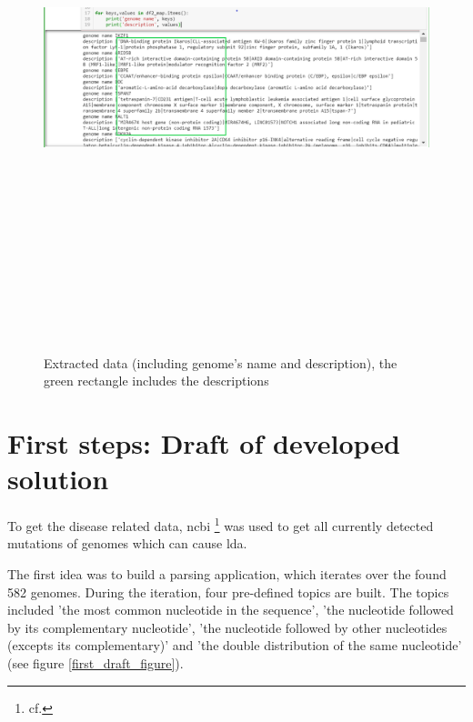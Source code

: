 \begin{figure}[htbp]
	\centering
	\includegraphics[width=1\textwidth, height=600px, keepaspectratio]{Image/gene_description.png}
	\caption{Extracted data (including genome's name and description), the green rectangle includes the descriptions}
	\label{gene_description_figure}
\end{figure}

\section{First steps: Draft of developed solution}\label{draft}

To get the disease related data, \gls{ncbi} \footnote{cf.\autocite{ncbi}} was used to get all currently detected mutations of genomes which can cause \gls{lda}.

The first idea was to build a parsing application, which iterates over the found 582 genomes.
During the iteration, four pre-defined topics are built. The topics included 'the most common nucleotide in the sequence', 'the nucleotide followed by its complementary nucleotide', 'the nucleotide followed by other nucleotides (excepts its complementary)' and 'the double distribution of the same nucleotide' (see figure \ref{first_draft_figure}).

